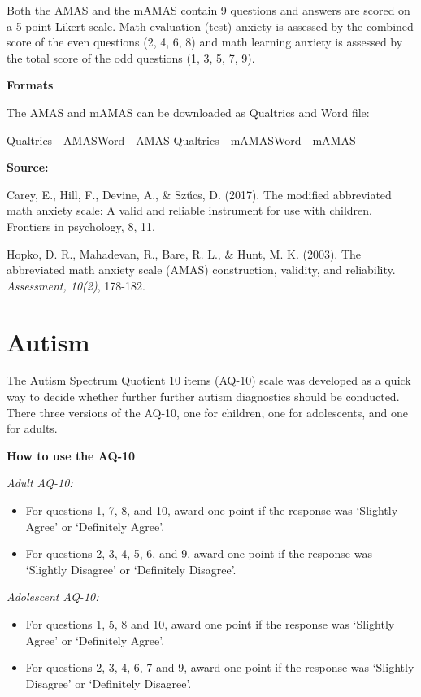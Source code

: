 \documentclass[
]{book}
\providecommand{\tightlist}{%
  \setlength{\itemsep}{0pt}\setlength{\parskip}{0pt}}
\begin{document}
Both the AMAS and the mAMAS contain 9 questions and answers are scored on a 5-point Likert scale. Math evaluation (test) anxiety is assessed by the combined score of the even questions (2, 4, 6, 8) and math learning anxiety is assessed by the total score of the odd questions (1, 3, 5, 7, 9).

\textbf{Formats}

The AMAS and mAMAS can be downloaded as Qualtrics and Word file:

\href{link}{Qualtrics - AMAS}\textbar{}\href{link}{Word - AMAS}
\href{link}{Qualtrics - mAMAS}\textbar{}\href{link}{Word - mAMAS}

\textbf{Source:}

Carey, E., Hill, F., Devine, A., \& Szűcs, D. (2017). The modified abbreviated math anxiety scale: A valid and reliable instrument for use with children. Frontiers in psychology, 8, 11.

Hopko, D. R., Mahadevan, R., Bare, R. L., \& Hunt, M. K. (2003). The abbreviated math anxiety scale (AMAS) construction, validity, and reliability. \emph{Assessment, 10(2)}, 178-182.

\hypertarget{autism}{%
\section{Autism}\label{autism}}

The Autism Spectrum Quotient 10 items (AQ-10) scale was developed as a quick way to decide whether further further autism diagnostics should be conducted. There three versions of the AQ-10, one for children, one for adolescents, and one for adults.

\textbf{How to use the AQ-10}

\emph{Adult AQ-10:}

\begin{itemize}
\tightlist
\item
  For questions 1, 7, 8, and 10, award one point if the response was `Slightly Agree' or `Definitely Agree'.
\item
  For questions 2, 3, 4, 5, 6, and 9, award one point if the response was `Slightly Disagree' or `Definitely Disagree'.
\end{itemize}

\emph{Adolescent AQ-10:}

\begin{itemize}
\tightlist
\item
  For questions 1, 5, 8 and 10, award one point if the response was `Slightly Agree' or `Definitely Agree'.
\item
  For questions 2, 3, 4, 6, 7 and 9, award one point if the response was `Slightly Disagree' or `Definitely Disagree'.
\end{itemize}
\end{document}
